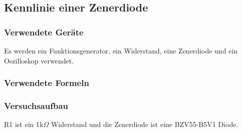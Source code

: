 \documentclass[12pt,a4paper]{article}
\begin{document}
\subsection{Kennlinie einer Zenerdiode}
\subsubsection{Verwendete Geräte}

Es werden ein Funktionsgenerator, ein Widerstand, eine Zenerdiode und ein Oszilloskop verwendet.

\subsubsection{Verwendete Formeln}
\subsubsection{Versuchsaufbau}

R1 ist ein 1k$\Omega$ Widerstand und die Zenerdiode ist eine BZV55-B5V1 Diode.
\end{document}
